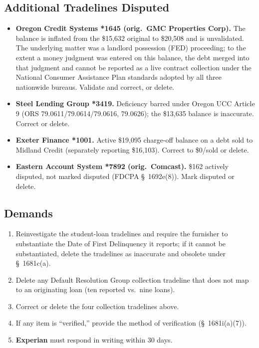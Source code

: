 \documentclass[12pt,letterpaper]{article}
\begin{document}
\subsection*{Additional Tradelines Disputed}
\begin{itemize}[noitemsep]
  \item \textbf{Oregon Credit Systems *1645 (orig.\ GMC Properties Corp).} The balance is inflated from the \$15,632 original to \$20,508 and is unvalidated. The underlying matter was a landlord possession (FED) proceeding; to the extent a money judgment was entered on this balance, the debt merged into that judgment and cannot be reported as a live contract collection under the National Consumer Assistance Plan standards adopted by all three nationwide bureaus. Validate and correct, or delete.
  \item \textbf{Steel Lending Group *3419.} Deficiency barred under Oregon UCC Article 9 (ORS 79.0611/79.0614/79.0616, 79.0626); the \$13,635 balance is inaccurate. Correct or delete.
  \item \textbf{Exeter Finance *1001.} Active \$19,095 charge-off balance on a debt sold to Midland Credit (separately reporting \$16,103). Correct to \$0/sold or delete.
  \item \textbf{Eastern Account System *7892 (orig.\ Comcast).} \$162 actively disputed, not marked disputed (FDCPA \S~1692e(8)). Mark disputed or delete.
\end{itemize}

\subsection*{Demands}
\begin{enumerate}[label=\arabic*., leftmargin=*]
  \item Reinvestigate the student-loan tradelines and require the furnisher to substantiate the Date of First Delinquency it reports; if it cannot be substantiated, delete the tradelines as inaccurate and obsolete under \S~1681c(a).
  \item Delete any Default Resolution Group collection tradeline that does not map to an originating loan (ten reported vs.\ nine loans).
  \item Correct or delete the four collection tradelines above.
  \item If any item is ``verified,'' provide the method of verification (\S~1681i(a)(7)).
  \item \textbf{Experian} must respond in writing within 30 days.
\end{enumerate}
\end{document}
